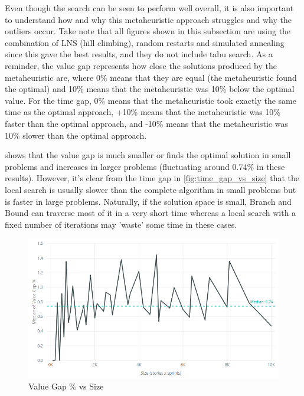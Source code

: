 Even though the search can be seen to perform well overall, it is also important to understand how and why this metaheuristic approach struggles and why the outliers occur. Take note that all figures shown in this subsection are using the combination of LNS (hill climbing), random restarts and simulated annealing since this gave the best results, and they do not include tabu search. As a reminder, the value gap represents how close the solutions produced by the metaheuristic are, where 0\% means that they are equal (the metaheuristic found the optimal) and 10\% means that the metaheuristic was 10\% below the optimal value. For the time gap, 0\% means that the metaheuristic took exactly the same time as the optimal approach, +10\% means that the metaheuristic was 10\% faster than the optimal approach, and -10\% means that the metaheuristic was 10\% slower than the optimal approach.

 shows that the value gap is much smaller or finds the optimal solution in small problems and increases in larger problems (fluctuating around 0.74\% in these results). However, it's clear from the time gap in \cref{fig:time_gap_vs_size} that the local search is usually slower than the complete algorithm in small problems but is faster in large problems. Naturally, if the solution space is small, Branch and Bound can traverse most of it in a very short time whereas a local search with a fixed number of iterations may 'waste' some time in these cases.

\begin{figure}[h!]
    \centering
    \includegraphics[width=\textwidth]{Figures/Results/annealing_value_gap_size.png}
    \caption{Value Gap \% vs Size}
    \label{fig:value_gap_vs_size}
\end{figure}

